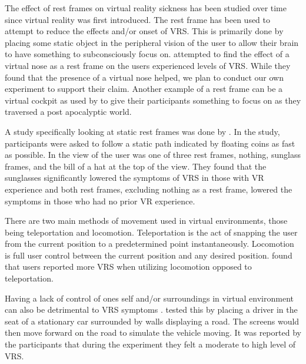\documentclass[sigconf]{acmart}
\begin{document}
The effect of rest frames on virtual reality sickness has been studied over time since virtual reality was first introduced. The rest frame has been used to attempt to reduce the effects and/or onset of VRS. This is primarily done by placing some static object in the peripheral vision of the user to allow their brain to have something to subconsciously focus on. \cite{wienrich18} attempted to find the effect of a virtual nose as a rest frame on the users experienced levels of VRS. While they found that the presence of a virtual nose helped, we plan to conduct our own experiment to support their claim. Another example of a rest frame can be a virtual cockpit as used by \cite{cao17} to give their participants something to focus on as they traversed a post apocalyptic world.

A study specifically looking at static rest frames was done by \cite{somrak21}. In the study, participants were asked to follow a static path indicated by floating coins as fast as possible. In the view of the user was one of three rest frames, nothing, sunglass frames, and the bill of a hat at the top of the view. They found that the sunglasses significantly lowered the symptoms of VRS in those with VR experience and both rest frames, excluding nothing as a rest frame, lowered the symptoms in those who had no prior VR experience.

There are two main methods of movement used in virtual environments, those being teleportation and locomotion. Teleportation is the act of snapping the user from the current position to a predetermined point instantaneously. Locomotion is full user control between the current position and any desired position. \cite{clifton20} found that users reported more VRS when utilizing locomotion opposed to teleportation.

Having a lack of control of ones self and/or surroundings in virtual environment can also be detrimental to VRS symptoms \cite{nurburger21}. \cite{Lin07} tested this by placing a driver in the seat of a stationary car surrounded by walls displaying a road. The screens would then move forward on the road to simulate the vehicle moving. It was reported by the participants that during the experiment they felt a moderate to high level of VRS.
\end{document}

